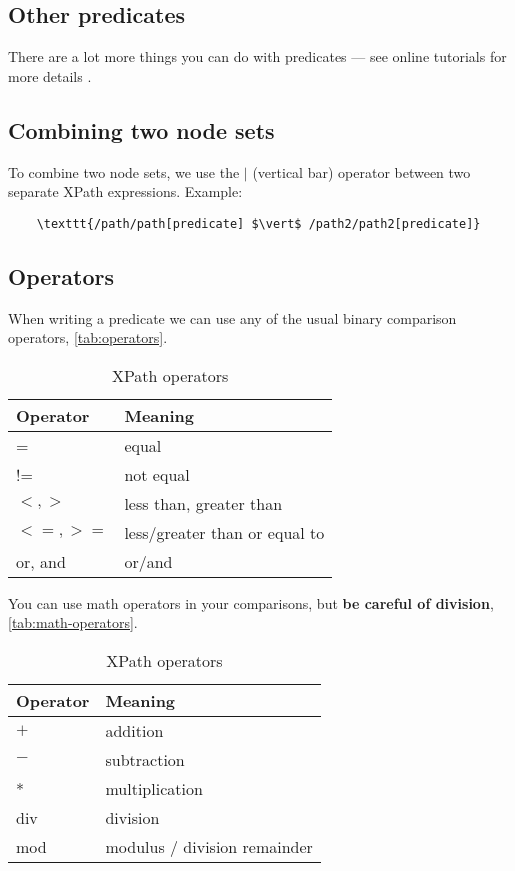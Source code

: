 \documentclass[slides]{pgnotes}
\begin{document}
\subsection{Other predicates}

There are a lot more things you can do with predicates --- see online tutorials for more details \cite{w3-schools:2013:xpath}. 

\subsection{Combining two node sets}

To combine two node sets, we use the $\vert$ (vertical bar) operator between two separate XPath expressions.
Example: 

\begin{verbatim}
    \texttt{/path/path[predicate] $\vert$ /path2/path2[predicate]}
\end{verbatim}



\subsection{Operators}

When writing a predicate we can use any of the usual binary comparison operators, \autoref{tab:operators}.

\begin{table}[htbp]
  \centering
  \begin{tabular}{l l}
    \toprule
    \textbf{Operator} & \textbf{Meaning} \\
    \midrule
    = & equal \\
    != & not equal \\
    $<, >$ & less than, greater than \\
    $<=, >=$ & less/greater than or equal to \\
    or, and & or/and \\
    \bottomrule
  \end{tabular}
  \caption{XPath operators}
  \label{tab:operators}
\end{table}

You can use math operators in your comparisons, but \textbf{be careful of division}, \autoref{tab:math-operators}. 

\begin{table}[htbp]
  \centering
  \begin{tabular}{l l}
    \toprule
    \textbf{Operator} & \textbf{Meaning} \\
    \midrule
    $+$ & addition \\
    $-$ & subtraction \\
    * & multiplication \\
    div & division \\
    mod & modulus / division remainder\\
    \bottomrule
  \end{tabular}
  \caption{XPath operators}
  \label{tab:math-operators}
\end{table}
\end{document}
